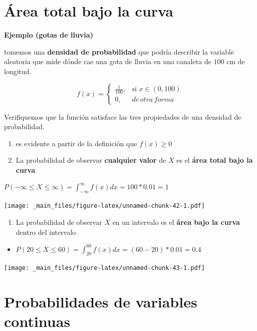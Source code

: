 \documentclass[
]{book}
\providecommand{\tightlist}{%
  \setlength{\itemsep}{0pt}\setlength{\parskip}{0pt}}
\begin{document}
\hypertarget{uxe1rea-total-bajo-la-curva}{%
\section{Área total bajo la curva}\label{uxe1rea-total-bajo-la-curva}}

\textbf{Ejemplo (gotas de lluvia)}

tomemos una \textbf{densidad de probabilidad} que podría describir la variable aleatoria que mide dónde cae una gota de lluvia en una canaleta de \(100\) cm de longitud.

\[
    f(x)= 
\begin{cases}
    \frac{1}{100},& \text{si } x\in (0,100)\\
    0,& de\, otra\, forma 
\end{cases}
\]

Verifiquemos que la función satisface las tres propiedades de una densidad de probabilidad.

\begin{enumerate}
\def\labelenumi{\arabic{enumi})}
\item
  es evidente a partir de la definición que \(f(x) \geq 0\)
\item
  La probabilidad de observar \textbf{cualquier valor} de \(X\) es el \textbf{área total bajo la curva}
\end{enumerate}

\(P( -\infty \leq X \leq \infty )= \int_{-\infty }^{\infty } f(x) dx = 100*0.01= 1\)

\texttt{[image: \_main\_files/figure-latex/unnamed-chunk-42-1.pdf]}

\begin{enumerate}
\def\labelenumi{\arabic{enumi})}
\setcounter{enumi}{2}
\tightlist
\item
  La probabilidad de observar \(X\) en un intervalo es el \textbf{área bajo la curva} dentro del intervalo
\end{enumerate}

\begin{itemize}
\tightlist
\item
  \(P( 20 \leq X \leq 60) = \int_{20}^{60} f(x) dx = (60-20)*0.01=0.4\)
\end{itemize}

\texttt{[image: \_main\_files/figure-latex/unnamed-chunk-43-1.pdf]}

\hypertarget{probabilidades-de-variables-continuas}{%
\section{Probabilidades de variables continuas}\label{probabilidades-de-variables-continuas}}
\end{document}
